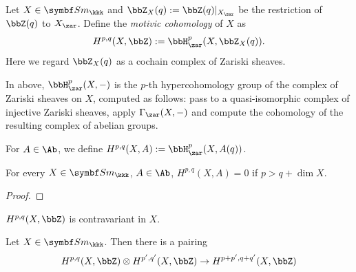   \begin{definition}
    Let $X \in \Sm_{\kkk}$ and $\bbZ_X(q) := \bbZ(q)|_{X_{\zar}}$ be the restriction of $\bbZ(q)$ to $X_{\zar}$.
    Define the \emph{motivic cohomology} of $X$ as
    \[ H^{p,q}(X,\bbZ) := \bbH^p_\zar(X, \bbZ_X(q)). \]
    Here we regard $\bbZ_X(q)$ as a cochain complex of Zariski sheaves.
  \end{definition}

  In above, $\bbH^p_\zar(X, -)$ is the $p$-th hypercohomology group of the complex of Zariski sheaves on $X$, computed as follows:
  pass to a quasi-isomorphic complex of injective Zariski sheaves, apply $\Gamma_\zar(X, -)$ and compute the cohomology of the resulting complex of abelian groups.

  For $A \in \Ab$, we define $H^{p,q}(X,A) := \bbH^p_\zar(X, A(q))$.

  \begin{proposition}
    For every $X \in \Sm_{\kkk}$, $A \in \Ab$, $H^{p,q}(X,A) = 0$ if $p > q + \dim X$.
  \end{proposition}
  \begin{proof}
    \Yang{}
  \end{proof}

  \begin{proposition}
    $H^{p,q}(X,\bbZ)$ is contravariant in $X$.
  \end{proposition}

  \begin{proposition}
    Let $X \in \Sm_{\kkk}$.
    Then there is a pairing
    \[ H^{p,q}(X,\bbZ) \otimes H^{p',q'}(X,\bbZ) \to H^{p+p', q+q'}(X,\bbZ) \]
  \end{proposition}





